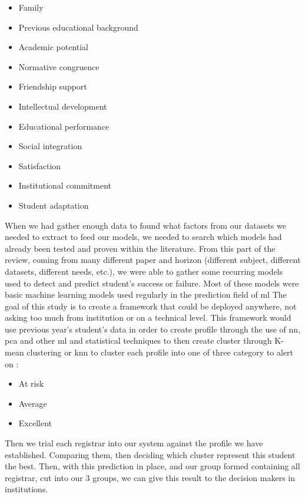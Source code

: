 \documentclass[../main.tex]{subfiles}
\begin{document}
\begin{itemize}
    \item Family
    \item Previous educational background
    \item Academic potential
    \item Normative congruence
    \item Friendship support
    \item Intellectual development
    \item Educational performance
    \item Social integration
    \item Satisfaction
    \item Institutional commitment
    \item Student adaptation
\end{itemize}

When we had gather enough data to found what factors from our datasets we needed to extract to feed our models, we needed to search which models had already been tested and proven within the literature. 
From this part of the review, coming from many different paper and horizon (different subject, different datasets, different needs, etc.), we were able to gather some recurring models used to detect and predict student's success or failure. Most of these models were basic machine learning models used regularly in the prediction field of \acrshort{ml}
The goal of this study is to create a framework that could be deployed anywhere, not asking too much from institution or on a technical level. This framework would use previous year's student's data in order to create profile through the use of \acrfull{nn}, \acrfull{pca} and other \acrfull{ml} and statistical techniques to then create cluster through K-mean clustering or \acrfull{knn} to cluster each profile into one of three category to alert on :
\begin{itemize}
    \item At risk
    \item Average
    \item Excellent
\end{itemize}

Then we trial each registrar into our system against the profile we have established. Comparing them, then deciding which cluster represent this student the best. Then, with this prediction in place, and our group formed containing all registrar, cut into our 3 groups, we can give this result to the decision makers in institutions.
\end{document}
